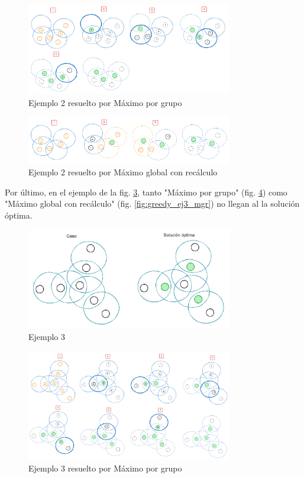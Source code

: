 \begin{figure}[H]
    \centering
    \includegraphics[width=0.8\textwidth]{img/greedy_ej2_mpg.png}
    \caption{Ejemplo 2 resuelto por Máximo por grupo}
    \label{fig:greedy_ej2_mpg}
\end{figure}

\begin{figure}[H]
    \centering
    \includegraphics[width=0.8\textwidth]{img/greedy_ej2_mgr.png}
    \caption{Ejemplo 2 resuelto por Máximo global con recálculo}
    \label{fig:greedy_ej2_mgr}
\end{figure}

Por último, en el ejemplo de la fig. \ref{fig:greedy_ej3}, tanto "Máximo por grupo" (fig. \ref{fig:greedy_ej3_mpg}) como "Máximo global con recálculo" (fig. \ref{fig:greedy_ej3_mgr}) no llegan al la solución óptima.

\begin{figure}[H]
    \centering
    \includegraphics[width=0.8\textwidth]{img/greedy_ej3.png}
    \caption{Ejemplo 3}
    \label{fig:greedy_ej3}
\end{figure}

\begin{figure}[H]
    \centering
    \includegraphics[width=0.8\textwidth]{img/greedy_ej3_mpg.png}
    \caption{Ejemplo 3 resuelto por Máximo por grupo}
    \label{fig:greedy_ej3_mpg}
\end{figure}

